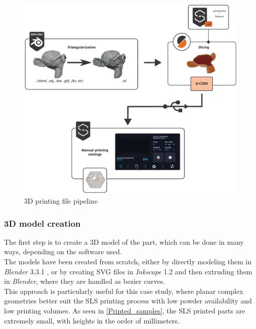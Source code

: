 \documentclass{article}
\begin{document}
                \begin{figure}[h!]
                    \centering 
                    \includegraphics[width=\textwidth]{Pictures/3dprint_file_pipeline_scheme.eps}
                    \caption{3D printing file pipeline}
                    \label{fig:3dprint_file_pipeline_scheme}
                \end{figure}

        \subsubsection{3D model creation\label{3D_model_creation}}

        The first step is to create a 3D model of the part, which can be done in many ways, 
        depending on the software used. \\

        The models have been created from scratch, either by directly modeling them in \textit{Blender} 3.3.1 \autocites{Blender},
        or by creating SVG files in \textit{Inkscape} 1.2 \autocites{Inkscape} and then extruding them in \textit{Blender}, where
        they are handled as bezier curves. \\

        This approach is particularly useful for this case study, where planar complex geometries better suit the SLS printing process
        with low powder availability and low printing volumes. As seen in \ref{Printed_samples}, the SLS printed parts 
        are extremely small, with heights in the order of millimeters. \\
        
\end{document}
